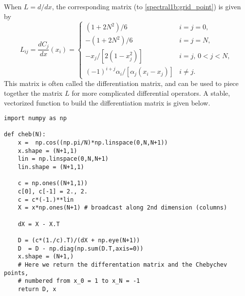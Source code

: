 When $L = d/dx$, the corresponding matrix (to \ref{spectral1b:grid_point}) is given by 
\[L_{ij} = \frac{dC_j}{dx}(x_i) = 
\begin{cases} (1+2N^2)/6 & i=j=0, \\ -(1+2N^2)/6 & i=j=N, \\
-x_j/[2(1-x_j^2)] & i=j, \, 0<j<N, \\ 
(-1)^{i+j}\alpha_i/[\alpha_j(x_i-x_j)] & i \not = j.
   \end{cases}
\]
This matrix is often called the differentiation matrix, and can be used to piece together the matrix $L$ for more complicated differential operators. 
A stable, vectorized function to build the differentiation matrix is given below. 


\begin{lstlisting}
import numpy as np

def cheb(N):
	x =  np.cos((np.pi/N)*np.linspace(0,N,N+1))
	x.shape = (N+1,1)
	lin = np.linspace(0,N,N+1)
	lin.shape = (N+1,1)
	
	c = np.ones((N+1,1))
	c[0], c[-1] = 2., 2.
	c = c*(-1.)**lin
	X = x*np.ones(N+1) # broadcast along 2nd dimension (columns)
	
	dX = X - X.T
	
	D = (c*(1./c).T)/(dX + np.eye(N+1))
	D  = D - np.diag(np.sum(D.T,axis=0))
	x.shape = (N+1,)
	# Here we return the differentation matrix and the Chebychev points, 
	# numbered from x_0 = 1 to x_N = -1
	return D, x

\end{lstlisting}










